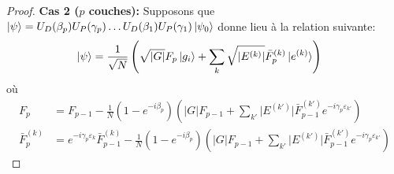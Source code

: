 \begin{proof}
\textbf{Cas 2 ($p$ couches):}
Supposons que $\ket{\psi} = U_{D}(\beta_{p}) U_{P}(\gamma_{p}) \dots U_{D}(\beta_{1})U_{P}(\gamma_{1})\ket{\psi_{0}}$ donne lieu à la relation suivante:
\begin{equation}
\begin{aligned}
    \ket{\psi} &= \frac{1}{\sqrt{ N }} \left( \sqrt{ \lvert G \rvert } F_{p} \ket{g_{i}} + \sum_{k} \sqrt{ \lvert E^{(k)} \rvert } \bar{F}^{(k)}_{p} \ket{e^{(k)}} \right)
\end{aligned}
\end{equation}
où
\begin{equation}
\begin{aligned}
    F_{p} &= F_{p-1} - \frac{1}{N} (1-e^{-i\beta_{p}}) \left( \lvert G \rvert   F_{p-1} + \sum_{k'} \lvert E^{(k')} \rvert \bar{F}^{(k')}_{p-1} e^{-i\gamma_{p}\varepsilon_{k'}} \right) \\
    \bar{F}^{(k)}_{p} &= e^{-i\gamma_{p} \varepsilon_{k}}\bar{F}_{p-1}^{(k)} - \frac{1}{N} (1-e^{-i\beta_{p}}) \left( \lvert G \rvert   F_{p-1} + \sum_{k'} \lvert E^{(k')} \rvert \bar{F}^{(k')}_{p-1} e^{-i\gamma_{p}\varepsilon_{k'}} \right)
\end{aligned}
\end{equation}


\end{proof}
